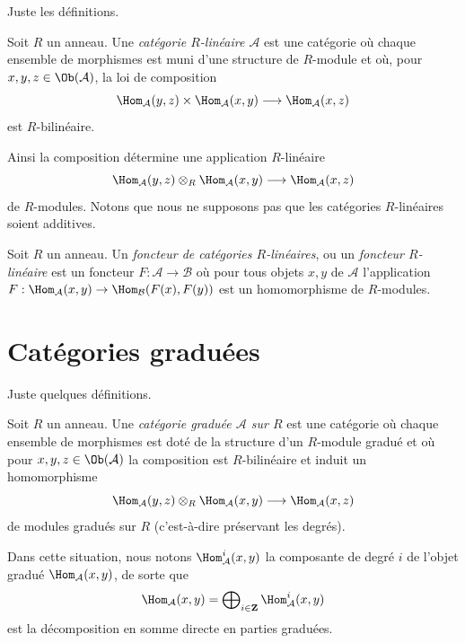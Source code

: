 \noindent
Juste les définitions.

\begin{definition}
\label{definition-linear-category}
Soit $R$ un anneau. Une {\it catégorie $R$-linéaire $\mathcal{A}$} est une
catégorie où chaque ensemble de morphismes est muni d'une structure de
$R$-module et où, pour $x, y, z \in \Ob(\mathcal{A})$, la loi de composition
$$
\Hom_\mathcal{A}(y, z) \times \Hom_\mathcal{A}(x, y)
\longrightarrow
\Hom_\mathcal{A}(x, z)
$$
est $R$-bilinéaire.
\end{definition}

\noindent
Ainsi la composition détermine une application $R$-linéaire
$$
\Hom_\mathcal{A}(y, z) \otimes_R \Hom_\mathcal{A}(x, y)
\longrightarrow
\Hom_\mathcal{A}(x, z)
$$
de $R$-modules. Notons que nous ne supposons pas que les catégories $R$-linéaires
soient additives.

\begin{definition}
\label{definition-functor-linear-categories}
Soit $R$ un anneau. Un {\it foncteur de catégories $R$-linéaires}, ou un {\it
foncteur $R$-linéaire} est un foncteur $F : \mathcal{A} \to \mathcal{B}$ où pour
tous objets $x, y$ de $\mathcal{A}$ l'application $F : \Hom_\mathcal{A}(x, y) \to
\Hom_\mathcal{B}(F(x), F(y))$ est un homomorphisme de $R$-modules.
\end{definition}







\section{Catégories graduées}
\label{section-graded}

\noindent
Juste quelques définitions.

\begin{definition}
\label{definition-graded-category}
Soit $R$ un anneau. Une {\it catégorie graduée $\mathcal{A}$ sur $R$} est une
catégorie où chaque ensemble de morphismes est doté de la structure d'un
$R$-module gradué et où pour $x, y, z \in \Ob(\mathcal{A})$ la composition est
$R$-bilinéaire et induit un homomorphisme
$$
\Hom_\mathcal{A}(y, z) \otimes_R \Hom_\mathcal{A}(x, y)
\longrightarrow
\Hom_\mathcal{A}(x, z)
$$
de modules gradués sur $R$ (c'est-à-dire préservant les degrés).
\end{definition}

\noindent
Dans cette situation, nous notons $\Hom_\mathcal{A}^i(x, y)$ la composante de degré $i$
de l'objet gradué $\Hom_\mathcal{A}(x, y)$, de sorte que
$$
\Hom_\mathcal{A}(x, y) =
\bigoplus\nolimits_{i \in \mathbf{Z}} \Hom_\mathcal{A}^i(x, y)
$$
est la décomposition en somme directe en parties graduées.


